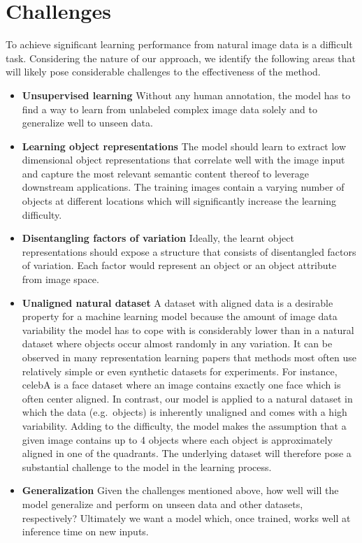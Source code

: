 \documentclass[a4paper,12pt]{report}
\begin{document}
\section{Challenges}
To achieve significant learning performance from natural image data is a difficult task. Considering the nature of our approach, we identify the following areas that will likely pose considerable challenges to the effectiveness of the method.
\begin{itemize}
  \item \textbf{Unsupervised learning} Without any human annotation, the model has to find a way to learn from unlabeled complex image data solely and to generalize well to unseen data.
  \item \textbf{Learning object representations} The model should learn to extract low dimensional object representations that correlate well with the image input and capture the most relevant semantic content thereof to leverage downstream applications. The training images contain a varying number of objects at different locations which will significantly increase the learning difficulty.
  \item \textbf{Disentangling factors of variation} Ideally, the learnt object representations should expose a structure that consists of disentangled factors of variation. Each factor would represent an object or an object attribute from image space.
  \item \textbf{Unaligned natural dataset} A dataset with aligned data is a desirable property for a machine learning model because the amount of image data variability the model has to cope with is considerably lower than in a natural dataset where objects occur almost randomly in any variation. It can be observed in many representation learning papers that methods most often use relatively simple or even synthetic datasets for experiments. For instance, celebA is a face dataset where an image contains exactly one face which is often center aligned. In contrast, our model is applied to a natural dataset in which the data (e.g.\ objects) is inherently unaligned and comes with a high variability. Adding to the difficulty, the model makes the assumption that a given image contains up to 4 objects where each object is approximately aligned in one of the quadrants. The underlying dataset will therefore pose a substantial challenge to the model in the learning process.
  \item \textbf{Generalization} Given the challenges mentioned above, how well will the model generalize and perform on unseen data and other datasets, respectively? Ultimately we want a model which, once trained, works well at inference time on new inputs. 
\end{itemize}
\end{document}
